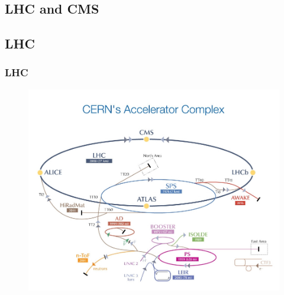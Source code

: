 \documentclass[11pt]{beamer}
\begin{document}
\begin{frame}
\section{LHC and CMS}
\subsection{LHC}
\frametitle{LHC}
	\begin{figure}
		\centering
	\includegraphics[scale=0.2]{figures/CERN's-accelerator-complex2013.jpg}
	\end{figure}
\end{frame}
\end{document}
